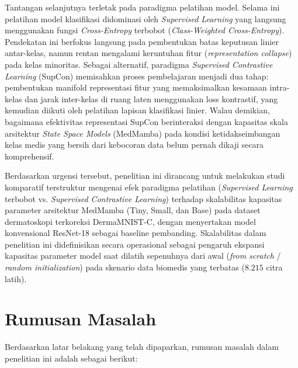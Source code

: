 Tantangan selanjutnya terletak pada paradigma pelatihan model. Selama ini pelatihan model klasifikasi didominasi oleh \textit{Supervised Learning} yang langsung menggunakan fungsi \textit{Cross-Entropy} terbobot (\textit{Class-Weighted Cross-Entropy}). Pendekatan ini berfokus langsung pada pembentukan batas keputusan linier antar-kelas, namun rentan mengalami keruntuhan fitur (\textit{representation collapse}) pada kelas minoritas. Sebagai alternatif, paradigma \textit{Supervised Contrastive Learning} (SupCon) \cite{khosla2020supervised} memisahkan proses pembelajaran menjadi dua tahap: pembentukan manifold representasi fitur yang memaksimalkan kesamaan intra-kelas dan jarak inter-kelas di ruang laten menggunakan loss kontrastif, yang kemudian diikuti oleh pelatihan lapisan klasifikasi linier. Walau demikian, bagaimana efektivitas representasi SupCon berinteraksi dengan kapasitas skala arsitektur \textit{State Space Models} (MedMamba) pada kondisi ketidakseimbangan kelas medis yang bersih dari kebocoran data belum pernah dikaji secara komprehensif.\par

Berdasarkan urgensi tersebut, penelitian ini dirancang untuk melakukan studi komparatif terstruktur mengenai efek paradigma pelatihan (\textit{Supervised Learning} terbobot vs. \textit{Supervised Contrastive Learning}) terhadap skalabilitas kapasitas parameter arsitektur MedMamba (Tiny, Small, dan Base) pada dataset dermatoskopi terkoreksi DermaMNIST-C, dengan menyertakan model konvensional ResNet-18 sebagai baseline pembanding. Skalabilitas dalam penelitian ini didefinisikan secara operasional sebagai pengaruh ekspansi kapasitas parameter model saat dilatih sepenuhnya dari awal (\textit{from scratch} / \textit{random initialization}) pada skenario data biomedis yang terbatas ($8.215$ citra latih). \par

\section{Rumusan Masalah} \label{I.Rumusan Masalah}
Berdasarkan latar belakang yang telah dipaparkan, rumusan masalah dalam penelitian ini adalah sebagai berikut: \par

